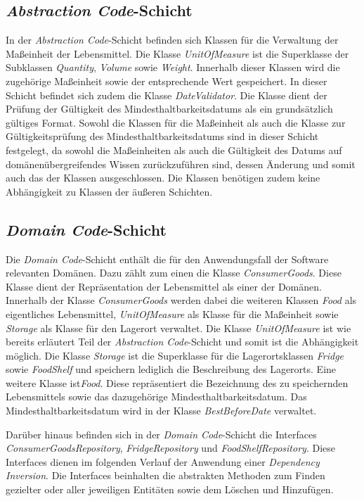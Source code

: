 \subsection*{\textit{Abstraction Code}-Schicht}
In der \textit{Abstraction Code}-Schicht befinden sich Klassen für die Verwaltung der Maßeinheit der Lebensmittel.
Die Klasse \textit{UnitOfMeasure} ist die Superklasse der Subklassen \textit{Quantity}, \textit{Volume} sowie \textit{Weight}.
Innerhalb dieser Klassen wird die zugehörige Maßeinheit sowie der entsprechende Wert gespeichert.
In dieser Schicht befindet sich zudem die Klasse \textit{DateValidator}.
Die Klasse dient der Prüfung der Gültigkeit des Mindesthaltbarkeitsdatums als ein grundsätzlich gültiges Format.
Sowohl die Klassen für die Maßeinheit als auch die Klasse zur Gültigkeitsprüfung des Mindesthaltbarkeitsdatums sind in dieser Schicht festgelegt, da sowohl die Maßeinheiten als auch die Gültigkeit des Datums auf domänenübergreifendes Wissen zurückzuführen sind, dessen Änderung und somit auch das der Klassen ausgeschlossen.
Die Klassen benötigen zudem keine Abhängigkeit zu Klassen der äußeren Schichten.

\subsection*{\textit{Domain Code}-Schicht}
Die \textit{Domain Code}-Schicht enthält die für den Anwendungsfall der Software relevanten Domänen.
Dazu zählt zum einen die Klasse \textit{ConsumerGoods}.
Diese Klasse dient der Repräsentation der Lebensmittel als einer der Domänen.
Innerhalb der Klasse \textit{ConsumerGoods} werden dabei die weiteren Klassen \textit{Food} als eigentliches Lebensmittel, \textit{UnitOfMeasure} als Klasse für die Maßeinheit sowie \textit{Storage} als Klasse für den Lagerort verwaltet.
Die Klasse \textit{UnitOfMeasure} ist wie bereits erläutert Teil der \textit{Abstraction Code}-Schicht und somit ist die Abhängigkeit möglich.
Die Klasse \textit{Storage} ist die Superklasse für die Lagerortsklassen \textit{Fridge} sowie \textit{FoodShelf} und speichern lediglich die Beschreibung des Lagerorts.
Eine weitere Klasse ist\textit{Food}. Diese repräsentiert die Bezeichnung des zu speichernden Lebensmittels sowie das dazugehörige Mindesthaltbarkeitsdatum.
Das Mindesthaltbarkeitsdatum wird in der Klasse \textit{BestBeforeDate} verwaltet.

Darüber hinaus befinden sich in der \textit{Domain Code}-Schicht die Interfaces \textit{ConsumerGoodsRepository}, \textit{FridgeRepository} und \textit{FoodShelfRepository}.
Diese Interfaces dienen im folgenden Verlauf der Anwendung einer \textit{Dependency Inversion}.
Die Interfaces beinhalten die abstrakten Methoden zum Finden gezielter oder aller jeweiligen Entitäten sowie dem Löschen und Hinzufügen.

